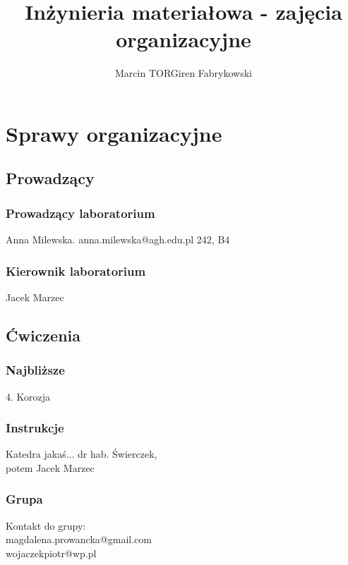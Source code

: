 \documentclass[a4paper,12pt]{article}
\title{Inżynieria materiałowa - zajęcia organizacyjne}
\author{Marcin TORGiren Fabrykowski}
\begin{document}
\maketitle
\newpage
\section{Sprawy organizacyjne}
\subsection{Prowadzący}
\subsubsection{Prowadzący laboratorium}
Anna Milewska.
anna.milewska@agh.edu.pl
242, B4
\subsubsection{Kierownik laboratorium}
Jacek Marzec
\subsection{Ćwiczenia}
\subsubsection{Najbliższe}
4. Korozja
\subsubsection{Instrukcje}
Katedra jakaś...
dr hab. Świerczek,\\
potem Jacek Marzec\\
\subsubsection{Grupa}
Kontakt do grupy:\\
magdalena.prowancka@gmail.com\\
wojaczekpiotr@wp.pl
\end{document}
